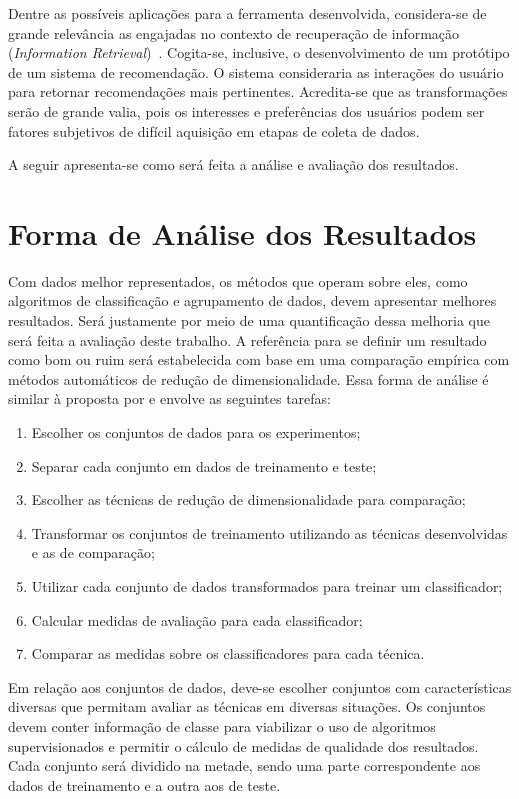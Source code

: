 Dentre as possíveis aplicações para a ferramenta
desenvolvida, considera-se de grande relevância as
engajadas no contexto de recuperação de informação
(\emph{Information Retrieval})~\cite{Manning2008}.
Cogita-se, inclusive, o desenvolvimento de um protótipo de um
sistema de recomendação. O sistema consideraria
as interações do usuário para retornar recomendações mais
pertinentes. Acredita-se que as transformações serão de
grande valia, pois os interesses e preferências dos usuários
podem ser fatores subjetivos de difícil aquisição em etapas
de coleta de dados.

A seguir apresenta-se como será feita a análise e avaliação
dos resultados.

\section{Forma de Análise dos Resultados}

Com dados melhor representados, os métodos que operam sobre
eles, como algoritmos de classificação e agrupamento de
dados, devem apresentar melhores resultados. Será justamente
por meio de uma quantificação dessa melhoria que será feita
a avaliação deste trabalho. A referência para se definir um
resultado como bom ou ruim será estabelecida com base em uma
comparação empírica com métodos automáticos de redução de
dimensionalidade. Essa forma de análise é similar à
proposta por \citet{Maaten2009} e envolve as seguintes
tarefas:

\begin{enumerate}
    \item Escolher os conjuntos de dados para os
        experimentos;
    \item Separar cada conjunto em dados de treinamento
        e teste;
    \item Escolher as técnicas de redução de
        dimensionalidade para comparação;
    \item Transformar os conjuntos de treinamento utilizando
        as técnicas desenvolvidas e as de comparação;
    \item Utilizar cada conjunto de dados transformados para
        treinar um classificador;
    \item Calcular medidas de avaliação para cada
        classificador;
    \item Comparar as medidas sobre os classificadores para
        cada técnica.
\end{enumerate}

Em relação aos conjuntos de dados, deve-se escolher
conjuntos com características diversas que permitam avaliar as
técnicas em diversas situações. Os conjuntos devem conter
informação de classe para viabilizar o uso de algoritmos
supervisionados e permitir o cálculo de medidas de qualidade
dos resultados. Cada conjunto será dividido na metade, sendo
uma parte correspondente aos dados de treinamento e a outra
aos de teste.

